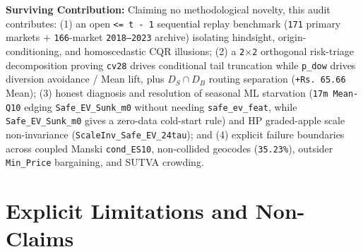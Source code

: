 \documentclass[11pt,a4paper]{article}
\begin{document}
\textbf{Surviving Contribution:} Claiming no methodological novelty, this audit contributes: (1) an open \texttt{<= t - 1} sequential replay benchmark (\texttt{171} primary markets + \texttt{166}-market \texttt{2018--2023} archive) isolating hindsight, origin-conditioning, and homoscedastic CQR illusions; (2) a \texttt{2$\times$2} orthogonal risk-triage decomposition proving \texttt{cv28} drives conditional tail truncation while \texttt{p\_dow} drives diversion avoidance / Mean lift, plus $D_S \cap D_B$ routing separation (\texttt{+Rs.\,65.66} Mean); (3) honest diagnosis and resolution of seasonal ML starvation (\texttt{17m Mean-Q10} edging \texttt{Safe\_EV\_Sunk\_m0} without needing \texttt{safe\_ev\_feat}, while \texttt{Safe\_EV\_Sunk\_m0} gives a zero-data cold-start rule) and HP graded-apple scale non-invariance (\texttt{ScaleInv\_Safe\_EV\_24tau}); and (4) explicit failure boundaries across coupled Manski \texttt{cond\_ES10}, non-collided geocodes (\texttt{35.23\%}), outsider \texttt{Min\_Price} bargaining, and SUTVA crowding.

\section{Explicit Limitations and Non-Claims}
\end{document}

